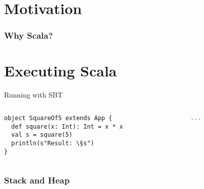 \documentclass[aspectratio=169]{beamer}
\begin{document}
\frame[plain]{\titlepage}


\section{Motivation}

\begin{frame}\frametitle{Why Scala?}
    

\end{frame}

\section{Executing Scala}

\begin{frame}[fragile]{Running with SBT}
~\\[-8mm]
\begin{columns}
\begin{column}{0.48\textwidth}
\begin{lstlisting}
object SquareOf5 extends App {
  def square(x: Int): Int = x * x
  val s = square(5)
  println(s"Result: \§s")
}
\end{lstlisting}
\end{column}
\begin{column}{0.48\textwidth}
\begin{lstlisting}[language=scala]
...
\end{lstlisting}
\end{column}
\end{columns}
\end{frame}


\begin{frame}\frametitle{Stack and Heap}
    \centering
    

\end{frame}
\end{document}
